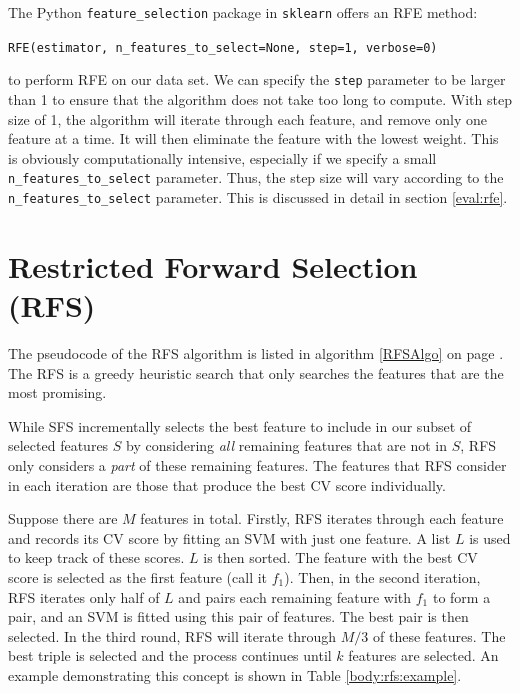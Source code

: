\documentclass[12pt, twoside, a4paper]{report}
\begin{document}
The Python \texttt{feature\_selection} package in \texttt{sklearn} offers an RFE method:
\begin{center}
\texttt{RFE(estimator, n\_features\_to\_select=None, step=1, verbose=0)}
\end{center}

to perform RFE on our data set. We can specify the \texttt{step} parameter to be larger than 1 to ensure that the algorithm does not take too long to compute. With step size of 1, the algorithm will iterate through each feature, and remove only one feature at a time. It will then eliminate the feature with the lowest weight. This is obviously computationally intensive, especially if we specify a small \texttt{n\_features\_to\_select} parameter. Thus, the step size will vary according to the \texttt{n\_features\_to\_select} parameter. This is discussed in detail in section \ref{eval:rfe}.

\section{Restricted Forward Selection (RFS)} \label{body:rfs}

The pseudocode of the RFS algorithm \cite{deng1998omega} is listed in algorithm \ref{RFSAlgo} on page \pageref{RFSAlgo}. The RFS is a greedy heuristic search that only searches the features that are the most promising.

While SFS incrementally selects the best feature to include in our subset of selected features $S$ by considering \textit{all} remaining features that are not in $S$, RFS only considers a \textit{part} of these remaining features. The features that RFS consider in each iteration are those that produce the best CV score individually.

Suppose there are $M$ features in total. Firstly, RFS iterates through each feature and records its CV score by fitting an SVM with just one feature. A list $L$ is used to keep track of these scores. $L$ is then sorted. The feature with the best CV score is selected as the first feature (call it $f_1$). Then, in the second iteration, RFS iterates only half of $L$ and pairs each remaining feature with $f_1$ to form a pair, and an SVM is fitted using this pair of features. The best pair is then selected. In the third round, RFS will iterate through $M/3$ of these features. The best triple is selected and the process continues until $k$ features are selected. An example demonstrating this concept is shown in Table \ref{body:rfs:example}.
\end{document}
